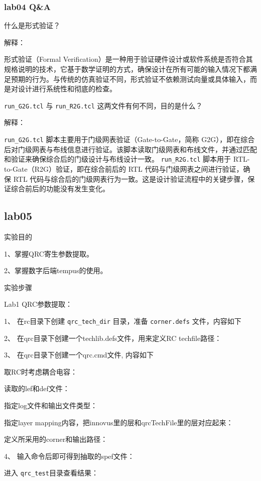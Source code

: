 \subsubsection{lab04 Q\&A}

什么是形式验证？

解释：

形式验证（Formal Verification）是一种用于验证硬件设计或软件系统是否符合其规格说明的技术，它基于数学证明的方式，确保设计在所有可能的输入情况下都满足预期的行为。与传统的仿真验证不同，形式验证不依赖测试向量或具体输入，而是对设计进行系统性和彻底的检查。

\texttt{run\_G2G.tcl} 与 \texttt{run\_R2G.tcl} 这两文件有何不同，目的是什么？

解释：

\texttt{run\_G2G.tcl} 脚本主要用于门级网表验证（Gate-to-Gate，简称 G2G），即在综合后对门级网表与布线信息进行验证。该脚本读取门级网表和布线文件，并通过匹配和验证来确保综合后的门级设计与布线设计一致。
\texttt{run\_R2G.tcl} 脚本用于 RTL-to-Gate（R2G）验证，即在综合前后的 RTL 代码与门级网表之间进行验证，确保 RTL 代码与综合后的门级网表行为一致。这是设计验证流程中的关键步骤，保证综合前后的功能没有发生变化。

\subsection{lab05}

实验目的

1、掌握QRC寄生参数提取。

2、掌握数字后端tempus的使用。

实验步骤

Lab1 QRC参数提取：

1、	在rc目录下创建 \texttt{qrc\_tech\_dir} 目录，准备 \texttt{corner.defs} 文件，内容如下
 
2、	在qrc目录下创建一个techlib.defs文件，用来定义RC techfile路径：
 
3、	在qrc目录下创建一个qrc.cmd文件, 内容如下

取RC时考虑耦合电容：
 
读取的lef和def文件：
 
指定log文件和输出文件类型：
 
指定layer mapping内容，把innovus里的层和qrcTechFile里的层对应起来：
 
定义所采用的corner和输出路径：
 
4、 输入命令后即可得到抽取的spef文件：
 
进入 \texttt{qrc\_test}目录查看结果：

